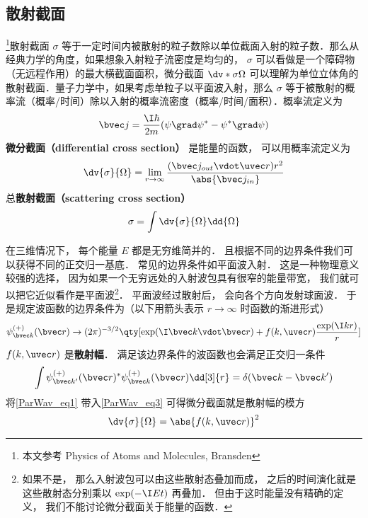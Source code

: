 

\subsection{散射截面}

\footnote{本文参考 Physics of Atoms and Molecules, Bransden}散射截面 $\sigma$ 等于一定时间内被散射的粒子数除以单位截面入射的粒子数．那么从经典力学的角度，如果想象入射粒子流密度是均匀的， $\sigma$ 可以看做是一个障碍物（无远程作用）的最大横截面面积，微分截面 $\dv*{\sigma}{\Omega}$ 可以理解为单位立体角的散射截面．量子力学中，如果考虑单粒子以平面波入射，那么 $\sigma$ 等于被散射的概率流（概率/时间）除以入射的概率流密度（概率/时间/面积）．概率流定义为
\begin{equation}
\bvec j = \frac{\I\hbar }{2m}(\psi \grad \psi^* - \psi^* \grad \psi )
\end{equation}
\textbf{微分截面（differential cross section）} 是能量的函数， 可以用概率流定义为
\begin{equation}\label{ParWav_eq3}
\dv{\sigma}{\Omega} = \lim_{r\to\infty} \frac{(\bvec j_{out} \vdot \uvec r) r^2}{\abs{\bvec j_{in}}}
\end{equation}
总\textbf{散射截面（scattering cross section）}
\begin{equation}
\sigma = \int \dv{\sigma}{\Omega} \dd{\Omega} 
\end{equation}

在三维情况下， 每个能量 $E$ 都是无穷维简并的． 且根据不同的边界条件我们可以获得不同的正交归一基底． 常见的边界条件如平面波入射． 这是一种物理意义较强的选择， 因为如果一个无穷远处的入射波包具有很窄的能量带宽， 我们就可以把它近似看作是平面波\footnote{如果不是， 那么入射波包可以由这些散射态叠加而成， 之后的时间演化就是这些散射态分别乘以 $\exp(-\I E t)$ 再叠加． 但由于这时能量没有精确的定义， 我们不能讨论微分截面关于能量的函数．}． 平面波经过散射后， 会向各个方向发射球面波． 于是规定波函数的边界条件为（以下用箭头表示 $r\to\infty$ 时函数的渐进形式）
\begin{equation}\label{ParWav_eq1}
\psi_{\bvec k}^{(+)}(\bvec r) \rightarrow (2\pi)^{-3/2} \qty[\exp(\I \bvec k \vdot \bvec r) + f(k, \uvec r) \frac{\exp(\I k r)}{r}]
\end{equation}
$f(k, \uvec r)$ 是\textbf{散射幅}． 满足该边界条件的波函数也会满足正交归一条件
\begin{equation}
\int \psi_{\bvec k'}^{(+)}(\bvec r)^* \psi_{\bvec k}^{(+)}(\bvec r) \dd[3]{r} = \delta(\bvec k - \bvec k')
\end{equation}
将\autoref{ParWav_eq1} 带入\autoref{ParWav_eq3} 可得微分截面就是散射幅的模方
\begin{equation}
\dv{\sigma}{\Omega} = \abs{f(k, \uvec r)}^2
\end{equation}

